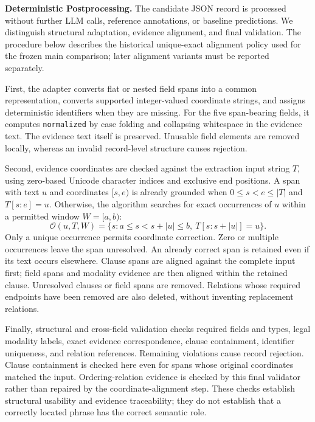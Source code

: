 
\textbf{Deterministic Postprocessing.}
The candidate JSON record is processed without further LLM calls, reference annotations, or baseline predictions. We distinguish structural adaptation, evidence alignment, and final validation. The procedure below describes the historical unique-exact alignment policy used for the frozen main comparison; later alignment variants must be reported separately.

First, the adapter converts flat or nested field spans into a common representation, converts supported integer-valued coordinate strings, and assigns deterministic identifiers when they are missing. For the five span-bearing fields, it computes \texttt{normalized} by case folding and collapsing whitespace in the evidence text. The evidence text itself is preserved. Unusable field elements are removed locally, whereas an invalid record-level structure causes rejection.

Second, evidence coordinates are checked against the extraction input string \(T\), using zero-based Unicode character indices and exclusive end positions. A span with text \(u\) and coordinates \([s,e)\) is already grounded when \(0\leq s<e\leq |T|\) and \(T[s:e]=u\). Otherwise, the algorithm searches for exact occurrences of \(u\) within a permitted window \(W=[a,b)\):
\begin{equation}
\mathcal{O}(u,T,W)=\{s:a\leq s<s+|u|\leq b,\ T[s:s+|u|]=u\}.
\end{equation}
Only a unique occurrence permits coordinate correction. Zero or multiple occurrences leave the span unresolved. An already correct span is retained even if its text occurs elsewhere. Clause spans are aligned against the complete input first; field spans and modality evidence are then aligned within the retained clause. Unresolved clauses or field spans are removed. Relations whose required endpoints have been removed are also deleted, without inventing replacement relations.

Finally, structural and cross-field validation checks required fields and types, legal modality labels, exact evidence correspondence, clause containment, identifier uniqueness, and relation references. Remaining violations cause record rejection. Clause containment is checked here even for spans whose original coordinates matched the input. Ordering-relation evidence is checked by this final validator rather than repaired by the coordinate-alignment step. These checks establish structural usability and evidence traceability; they do not establish that a correctly located phrase has the correct semantic role.

